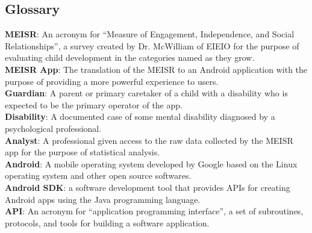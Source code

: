 \begin{appendices}
\chapter{Glossary}
\textbf{MEISR}: An acronym for “Measure of Engagement, Independence, and Social Relationships”, a survey created by Dr. McWilliam of EIEIO for the purpose of evaluating child development in the categories named as they grow.\\
\textbf{MEISR App}: The translation of the MEISR to an Android application with the purpose of providing a more powerful experience to users.\\
\textbf{Guardian}: A parent or primary caretaker of a child with a disability who is expected to be the primary operator of the app.\\
\textbf{Disability}: A documented case of some mental disability diagnosed by a psychological professional.\\
\textbf{Analyst}: A professional given access to the raw data collected by the MEISR app for the purpose of statistical analysis.\\
\textbf{Android}: A mobile operating system developed by Google based on the Linux operating system and other open source softwares.\\
\textbf{Android SDK}: a software development tool that provides APIs for creating Android apps using the Java programming language.\\
\textbf{API}: An acronym for “application programming interface”, a set of subroutines, protocols, and tools for building a software application.\\
\end{appendices}


